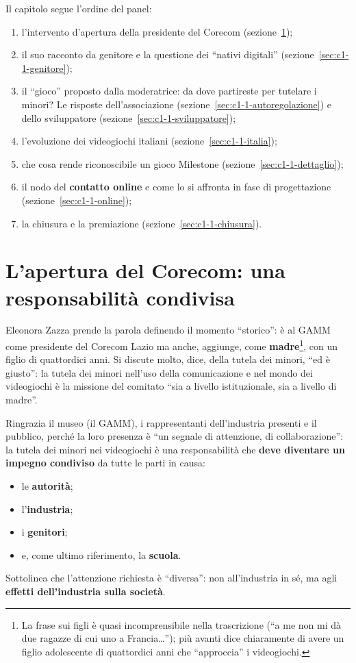 Il capitolo segue l'ordine del panel:
\begin{enumerate}
  \item l'intervento d'apertura della presidente del Corecom
        (sezione~\ref{sec:c1-1-zazza});
  \item il suo racconto da genitore e la questione dei ``nativi digitali''
        (sezione~\ref{sec:c1-1-genitore});
  \item il ``gioco'' proposto dalla moderatrice: da dove partireste per
        tutelare i minori? Le risposte dell'associazione
        (sezione~\ref{sec:c1-1-autoregolazione}) e dello sviluppatore
        (sezione~\ref{sec:c1-1-sviluppatore});
  \item l'evoluzione dei videogiochi italiani
        (sezione~\ref{sec:c1-1-italia});
  \item che cosa rende riconoscibile un gioco Milestone
        (sezione~\ref{sec:c1-1-dettaglio});
  \item il nodo del \textbf{contatto online} e come lo si affronta in fase di
        progettazione (sezione~\ref{sec:c1-1-online});
  \item la chiusura e la premiazione (sezione~\ref{sec:c1-1-chiusura}).
\end{enumerate}

\section{L'apertura del Corecom: una responsabilità condivisa}
\label{sec:c1-1-zazza}

Eleonora Zazza prende la parola definendo il momento ``storico'': è al GAMM
come presidente del Corecom Lazio ma anche, aggiunge, come
\textbf{madre}\footnote{La frase sui figli è quasi incomprensibile nella
trascrizione (``a me non mi dà due ragazze di cui uno a Francia\dots''); più
avanti dice chiaramente di avere un figlio adolescente di quattordici anni che
``approccia'' i videogiochi.}, con un figlio di quattordici anni. Si discute
molto, dice, della tutela dei minori, ``ed è giusto'': la tutela dei minori
nell'uso della comunicazione e nel mondo dei videogiochi è la missione del
comitato ``sia a livello istituzionale, sia a livello di madre''.

Ringrazia il museo (il GAMM), i rappresentanti dell'industria presenti e il
pubblico, perché la loro presenza è ``un segnale di attenzione, di
collaborazione'': la tutela dei minori nei videogiochi è una responsabilità che
\textbf{deve diventare un impegno condiviso} da tutte le parti in causa:
\begin{itemize}
  \item le \textbf{autorità};
  \item l'\textbf{industria};
  \item i \textbf{genitori};
  \item e, come ultimo riferimento, la \textbf{scuola}.
\end{itemize}
Sottolinea che l'attenzione richiesta è ``diversa'': non all'industria in sé,
ma agli \textbf{effetti dell'industria sulla società}.

